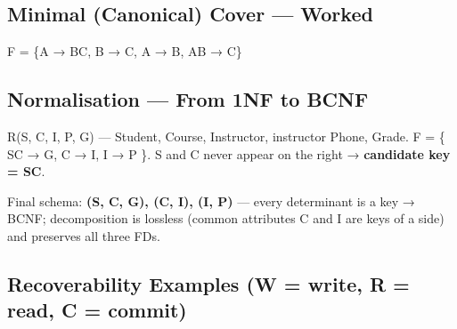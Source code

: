 \endgroup

\needspace{125pt}

\hypertarget{p2-04--122-minimal-canonical-cover--worked}{%
\subsection{Minimal (Canonical) Cover --- Worked}\label{p2-04--122-minimal-canonical-cover--worked}}

F = \{A → BC, B → C, A → B, AB → C\}



\needspace{125pt}

\hypertarget{p2-04--123-normalisation--from-1nf-to-bcnf}{%
\subsection{Normalisation --- From 1NF to BCNF}\label{p2-04--123-normalisation--from-1nf-to-bcnf}}

R(S, C, I, P, G) --- Student, Course, Instructor, instructor Phone, Grade.
F = \{ SC → G, C → I, I → P \}. S and C never appear on the right → \textbf{candidate key = SC}.



Final schema: \textbf{(S, C, G), (C, I), (I, P)} --- every determinant is a key → BCNF; decomposition is lossless (common attributes C and I are keys of a side) and preserves all three FDs.

\needspace{130pt}

\hypertarget{p2-04--124-recoverability-examples-w--write-r--read-c--commit}{%
\subsection{Recoverability Examples (W = write, R = read, C = commit)}\label{p2-04--124-recoverability-examples-w--write-r--read-c--commit}}

\begingroup\small

